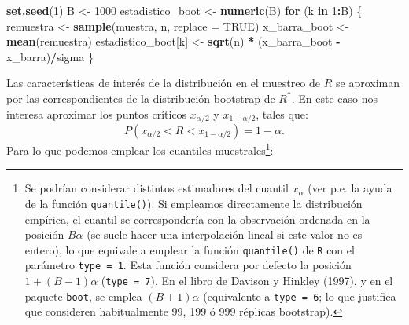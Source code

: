 \documentclass[
]{book}
\newenvironment{Shaded}{\begin{snugshade}}{\end{snugshade}}
\newcommand{\ControlFlowTok}[1]{\textcolor[rgb]{0.13,0.29,0.53}{\textbf{#1}}}
\newcommand{\DataTypeTok}[1]{\textcolor[rgb]{0.13,0.29,0.53}{#1}}
\newcommand{\DecValTok}[1]{\textcolor[rgb]{0.00,0.00,0.81}{#1}}
\newcommand{\KeywordTok}[1]{\textcolor[rgb]{0.13,0.29,0.53}{\textbf{#1}}}
\newcommand{\NormalTok}[1]{#1}
\newcommand{\OperatorTok}[1]{\textcolor[rgb]{0.81,0.36,0.00}{\textbf{#1}}}
\newcommand{\OtherTok}[1]{\textcolor[rgb]{0.56,0.35,0.01}{#1}}
\newcommand{\StringTok}[1]{\textcolor[rgb]{0.31,0.60,0.02}{#1}}
\theoremstyle{break}
\theoremstyle{definition}
\theoremstyle{definition}
\theoremstyle{definition}
\theoremstyle{remark}
\begin{document}
\begin{Shaded}
\begin{Highlighting}[]
\KeywordTok{set.seed}\NormalTok{(}\DecValTok{1}\NormalTok{)}
\NormalTok{B <-}\StringTok{ }\DecValTok{1000}
\NormalTok{estadistico_boot <-}\StringTok{ }\KeywordTok{numeric}\NormalTok{(B)}
\ControlFlowTok{for}\NormalTok{ (k }\ControlFlowTok{in} \DecValTok{1}\OperatorTok{:}\NormalTok{B) \{}
\NormalTok{    remuestra <-}\StringTok{ }\KeywordTok{sample}\NormalTok{(muestra, n, }\DataTypeTok{replace =} \OtherTok{TRUE}\NormalTok{)}
\NormalTok{    x_barra_boot <-}\StringTok{ }\KeywordTok{mean}\NormalTok{(remuestra)}
\NormalTok{    estadistico_boot[k] <-}\StringTok{ }\KeywordTok{sqrt}\NormalTok{(n) }\OperatorTok{*}\StringTok{ }\NormalTok{(x_barra_boot }\OperatorTok{-}\StringTok{ }\NormalTok{x_barra)}\OperatorTok{/}\NormalTok{sigma}
\NormalTok{\}}
\end{Highlighting}
\end{Shaded}

Las características de interés de la distribución en el muestreo de \(R\)
se aproximan por las correspondientes de la distribución bootstrap de \(R^{\ast}\).
En este caso nos interesa aproximar los puntos críticos \(x_{\alpha /2}\) y
\(x_{1-\alpha /2}\), tales que:
\[P\left( x_{\alpha /2} < R < x_{1-\alpha /2} \right) = 1-\alpha.\]
Para lo que podemos emplear los cuantiles muestrales\footnote{Se podrían considerar distintos estimadores del cuantil \(x_{\alpha}\)
  (ver p.e. la ayuda de la función \texttt{quantile()}).
  Si empleamos directamente la distribución empírica, el cuantil se
  correspondería con la observación ordenada en la posición \(B \alpha\)
  (se suele hacer una interpolación lineal si este valor no es entero),
  lo que equivale a emplear la función \texttt{quantile()} de \texttt{R} con el parámetro
  \texttt{type\ =\ 1}. Esta función considera por defecto la posición
  \(1 + (B - 1) \alpha\) (\texttt{type\ =\ 7}).
  En el libro de Davison y Hinkley (1997), y en el paquete \texttt{boot}, se emplea \((B + 1) \alpha\) (equivalente a \texttt{type\ =\ 6}; lo que justifica que
  consideren habitualmente 99, 199 ó 999 réplicas bootstrap).}:
\end{document}
